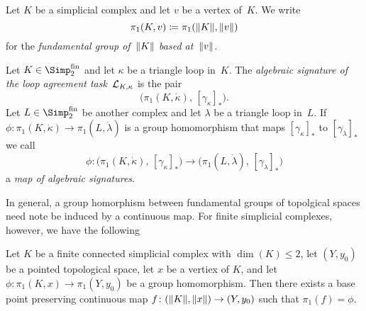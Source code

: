 \begin{thConvention}
    Let $K$ be a simplicial complex and let $v$ be a vertex of~$K$.
    We write
    \[ \pi_1(K,v) \coloneqq \pi_1(\lVert K\rVert, \lVert v\rVert) \]
    for the \emph{fundamental group of~$\lVert K\rVert$ based at~$\lVert v\rVert$}.
\end{thConvention}

\begin{thDef}
    Let $K\in\finSimp$ and let $\kappa$ be a triangle loop in~$K$. The
    \emph{algebraic signature of the loop agreement task~$\mathcal{L}_{K,\kappa}$}
    is the pair
    \[ \bigl( \pi_1(K,\dot\kappa), \, [\gamma_\kappa]_\ast \bigr) . \]
    Let $L\in\finSimp$ be another complex and let $\lambda$ be a triangle loop
    in~$L$. If $\phi\colon\pi_1(K,\dot\kappa)\to\pi_1(L,\dot\lambda)$ is a
    group homomorphism that maps $[\gamma_\kappa]_\ast$ to
    $[\gamma_\lambda]_\ast$ we call
    \[ \phi\colon \bigl( \pi_1(K,\dot\kappa), \, [\gamma_\kappa]_\ast \bigr)
        \to \bigl( \pi_1(L,\dot\lambda), \, [\gamma_\lambda]_\ast \bigr)
    \]
    a \emph{map of algebraic signatures}.
\end{thDef}

In general, a group homorphism between fundamental groups of topolgical spaces
need note be induced by a continuous map. For finite simplicial complexes,
however, we have the following

\begin{thLemma}
    Let $K$ be a finite connected simplicial complex with $\dim(K)\leq 2$,
    let $(Y,y_0)$ be a pointed topological space, let $x$ be a vertiex of $K$,
    and let $\phi\colon\pi_1(K,x)\to\pi_1(Y,y_0)$ be a group homomorphism.
    Then there exists a base point preserving continuous map
    $f\colon(\lVert K\rVert,\lVert x\rVert)\to(Y,y_0)$ such that $\pi_1(f) = \phi$.
\end{thLemma}

